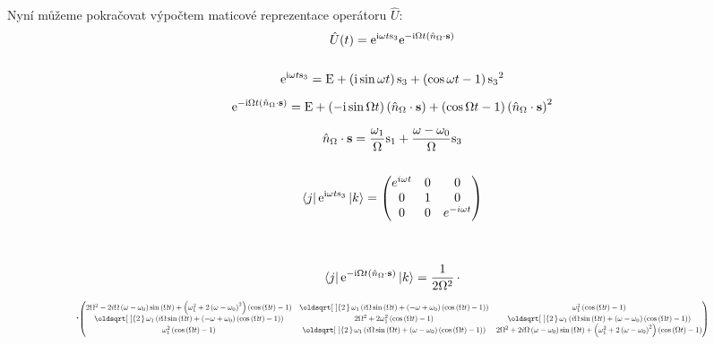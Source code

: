 \documentclass[10pt,a4paper]{article}
\renewcommand*{\sqrt}[2][\ ]{\oldsqrt[#1]{#2\,}\,}
\newcommand{\const}[1]{\text{#1}}
\newcommand{\mat}[1]{
    \begin{pmatrix}
        #1
    \end{pmatrix}
}
\newcommand{\bra}[1]{\left< #1 \right|}
\newcommand{\ket}[1]{\left| #1 \right>}
\newcommand{\e}[1]{\const{e}^{#1}}
\renewcommand{\i}{\const{i}}
\begin{document}
Nyní můžeme pokračovat výpočtem maticové reprezentace operátoru $\hat{U}$:
\begin{gather*}
    \hat{U}(t) =
    \e{\i\omega t \const{s}_3}
    \e{-\i\Omega t \left(\hat{n}_\Omega \cdot \mathbf{s}\right)}
    \\
    \\
    \e{\i\omega t \const{s}_3} =
    \const{E} +
    \left(\i\sin\omega t\right)\const{s}_3 +
    \left(\cos\omega t - 1\right){\const{s}_3}^2
    \\[5pt]
    \e{-\i\Omega t \left(\hat{n}_\Omega \cdot \mathbf{s}\right)} =
    \const{E} +
    \left(-\i\sin\Omega t\right)
    \left(\hat{n}_\Omega \cdot \mathbf{s}\right) +
    \left(\cos\Omega t - 1\right)
    \left(\hat{n}_\Omega \cdot \mathbf{s}\right)^2
    \\[5pt]
    \hat{n}_\Omega \cdot \mathbf{s}
    =
    \frac{\omega_1}{\Omega} \const{s}_1 +
    \frac{\omega-\omega_0}{\Omega} \const{s}_3
    \\
    \\
    \bra{j}
    \e{\i\omega t \const{s}_3}
    \ket{k}
    =
    \mat{e^{i \omega t} & 0 & 0\\0 & 1 & 0\\0 & 0 & e^{- i \omega t}}
    \\
    \\
    \\
    \bra{j}
    \e{-\i\Omega t \left(\hat{n}_\Omega \cdot \mathbf{s}\right)}
    \ket{k}
    =
    \frac{1}{2 \Omega^2} \,\cdot \\[5pt]
    \cdot
    \scalebox{0.6}{$\mat{2 \Omega^{2} - 2 i \Omega \left(\omega - \omega_{0}\right) \sin{\left(\Omega t \right)} + \left(\omega_{1}^{2} + 2 \left(\omega - \omega_{0}\right)^{2}\right) \left(\cos{\left(\Omega t \right)} - 1\right) & \sqrt{2} \omega_{1} \left(i \Omega \sin{\left(\Omega t \right)} + \left(- \omega + \omega_{0}\right) \left(\cos{\left(\Omega t \right)} - 1\right)\right) & \omega_{1}^{2} \left(\cos{\left(\Omega t \right)} - 1\right)\\\sqrt{2} \omega_{1} \left(i \Omega \sin{\left(\Omega t \right)} + \left(- \omega + \omega_{0}\right) \left(\cos{\left(\Omega t \right)} - 1\right)\right) & 2 \Omega^{2} + 2 \omega_{1}^{2} \left(\cos{\left(\Omega t \right)} - 1\right) & \sqrt{2} \omega_{1} \left(i \Omega \sin{\left(\Omega t \right)} + \left(\omega - \omega_{0}\right) \left(\cos{\left(\Omega t \right)} - 1\right)\right)\\\omega_{1}^{2} \left(\cos{\left(\Omega t \right)} - 1\right) & \sqrt{2} \omega_{1} \left(i \Omega \sin{\left(\Omega t \right)} + \left(\omega - \omega_{0}\right) \left(\cos{\left(\Omega t \right)} - 1\right)\right) & 2 \Omega^{2} + 2 i \Omega \left(\omega - \omega_{0}\right) \sin{\left(\Omega t \right)} + \left(\omega_{1}^{2} + 2 \left(\omega - \omega_{0}\right)^{2}\right) \left(\cos{\left(\Omega t \right)} - 1\right)}$}

\end{gather*}
\end{document}
